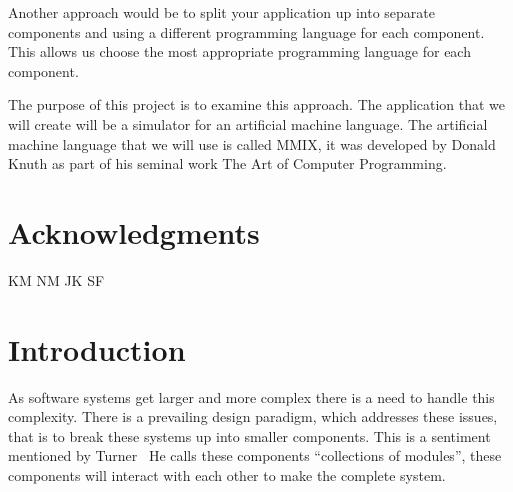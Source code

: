 \documentclass[a4paper,11pt]{report}
\begin{document}
Another approach would be to split your application up into separate components and using a different programming language for each component. This allows us choose the most appropriate programming language for each component.

The purpose of this project is to examine this approach. The application that we will create will be a simulator for an artificial machine language. The artificial machine language that we will use is called MMIX, it was developed by Donald Knuth as part of his seminal work The Art of Computer Programming\cite{knuth:aocp1}.
\newpage
{}
\tableofcontents
\newpage
\listoffigures
\newpage
\chapter*{Acknowledgments}
KM NM JK SF


\chapter{Introduction}
As software systems get larger and more complex there is a need to handle this complexity. There is a prevailing design paradigm, which addresses these issues, that is to break these systems up into smaller components.  This is a sentiment mentioned by Turner~\cite{turner:why}  He calls these components ``collections of modules'', these components will interact with each other to make the complete system. 
\end{document}
